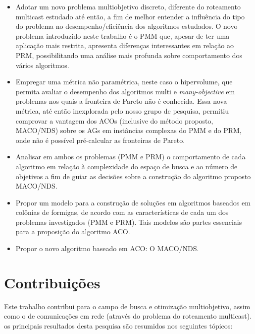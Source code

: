 \begin{itemize}  
	\item Adotar um novo problema multiobjetivo discreto, diferente do roteamento multicast estudado até então, a fim de melhor entender a influência do tipo do problema no desempenho/eficiência dos algoritmos estudados. O novo problema introduzido neste trabalho é o \ac{PMM} que, apesar de ter uma aplicação mais restrita, apresenta diferenças interessantes em relação ao \ac{PRM}, possibilitando uma análise mais profunda sobre comportamento dos vários algoritmos.
	\item Empregar uma métrica não paramétrica, neste caso o hipervolume, que permita avaliar o desempenho dos algoritmos multi e \textit{many-objective} em problemas nos quais a fronteira de Pareto não é conhecida. Essa nova métrica, até então inexplorada pelo nosso grupo de pesquisa, permitiu comprovar a vantagem dos ACOs (inclusive do método proposto, MACO/NDS) sobre os AGs em instâncias complexas do PMM e do PRM, onde não é possível pré-calcular as fronteiras de Pareto.
	\item Analisar em ambos os problemas (\ac{PMM} e \ac{PRM}) o comportamento de cada algoritmo em relação à complexidade do espaço de busca e ao número de objetivos a fim de guiar as decisões sobre a construção do algoritmo proposto MACO/NDS. 
	\item Propor um modelo para a construção de soluções em algoritmos baseados em colônias de formigas, de acordo com as características de cada um dos problemas investigados (PMM e PRM). Tais modelos são partes essenciais para a proposição do algoritmo ACO.
	\item Propor o novo algoritmo baseado em \ac{ACO}: O \ac{MACO/NDS}.
\end{itemize}


\section{Contribuições}
Este trabalho contribui para o campo de busca e otimização multiobjetivo, assim como o de comunicações em rede (através do problema do roteamento multicast). os principais resultados desta pesquisa são resumidos nos seguintes tópicos:


